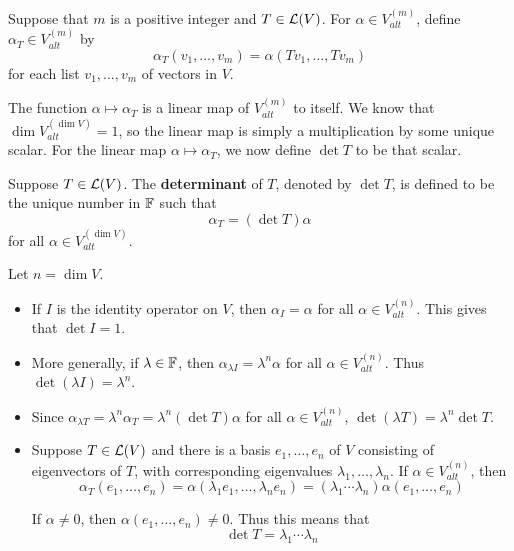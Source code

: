 \documentclass{extarticle}
\begin{document}
\begin{definition}[\(\alpha_T\)]
    Suppose that \(m\) is a positive integer and \(T \in \mathcal{L}(V)\). For \(\alpha \in V_{alt}^{(m)}\), define 
    \(\alpha_T \in V_{alt}^{(m)}\) by 
    \[\alpha_T(v_1, \ldots, v_m) = \alpha(Tv_1, \ldots, Tv_m)\]
    for each list \(v_1, \ldots, v_m\) of vectors in \(V\).
\end{definition}

\begin{remark}
    The function \(\alpha \mapsto \alpha_T\) is a linear map of \(V_{alt}^{(m)}\) to itself. We know 
    that \(\dim V_{alt}^{(\dim V)} = 1\), so the linear map is simply a multiplication by some unique scalar.
    For the linear map \(\alpha \mapsto \alpha_T\), we now define \(\det T\) to be that scalar.
\end{remark}

\begin{definition}
    Suppose \(T \in \mathcal{L}(V)\). The \textbf{determinant} of \(T\), denoted by \(\det T\), is defined to be the 
    unique number in \(\mathbb{F}\) such that 
    \[\alpha_T = (\det T) \alpha\]
    for all \(\alpha \in V_{alt}^{(\dim V)}\).
\end{definition}

\begin{remark}
    Let \(n = \dim V\). 

    \begin{itemize}
        \item If \(I\) is the identity operator on \(V\), then \(\alpha_I = \alpha\) for all \(\alpha \in V_{alt}^{(n)}\). 
        This gives that \(\det I = 1\).
        
        \item More generally, if \(\lambda \in \mathbb{F}\), then \(\alpha_{\lambda I} = \lambda^n \alpha\) 
        for all \(\alpha \in V_{alt}^{(n)}\). Thus \(\det (\lambda I) = \lambda^n\).

        \item Since \(\alpha_{\lambda T} = \lambda^n \alpha_T = \lambda^n (\det T) \alpha\) for all  
        \(\alpha \in V_{alt}^{(n)}\), \(\det (\lambda T) = \lambda^n \det T\). 

        \item Suppose \(T \in \mathcal{L}(V)\) and there is a basis \(e_1, \ldots, e_n\) of \(V\) consisting of 
        eigenvectors of \(T\), with corresponding eigenvalues \(\lambda_1, \ldots, \lambda_n\). If 
        \(\alpha \in V_{alt}^{(n)}\), then 
        \[\alpha_T (e_1, \ldots, e_n) = \alpha (\lambda_1 e_1, \ldots, \lambda_n e_n) = (\lambda_1 \cdots \lambda_n) \alpha(e_1, \ldots, e_n)\]

        If \(\alpha \neq 0\), then \(\alpha(e_1, \ldots, e_n) \neq 0\). Thus this means that 
        \[\det T = \lambda_1 \cdots \lambda_n\]
    \end{itemize}
\end{remark}
\end{document}
